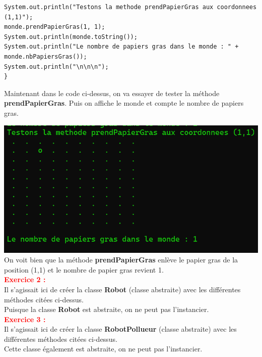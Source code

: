 \documentclass{article}
\begin{document}
\begin{lstlisting}
System.out.println("Testons la methode prendPapierGras aux coordonnees (1,1)");
monde.prendPapierGras(1, 1);
System.out.println(monde.toString());
System.out.println("Le nombre de papiers gras dans le monde : " + monde.nbPapiersGras());
System.out.println("\n\n\n");
}\end{lstlisting}

Maintenant dans le code ci-dessus, on va essayer de tester la méthode \textbf{prendPapierGras}.
Puis on affiche le monde et compte le nombre de papiers gras.

\includegraphics[scale=0.5]{../images/exo1.1.png}\\

On voit bien que la méthode \textbf{prendPapierGras} enlève le papier gras de la position (1,1) et le nombre de papier gras revient 1.\\

\textcolor{red}{\textbf{\Large{Exercice 2 :}}}\\
Il s'agissait ici de créer la classe \textbf{Robot} (classe abstraite) avec les différentes méthodes citées ci-dessus.\\
Puisque la classe \textbf{Robot} est abstraite, on ne peut pas l'instancier.\\

\textcolor{red}{\textbf{\Large{Exercice 3 :}}}\\
Il s'agissait ici de créer la classe \textbf{RobotPollueur} (classe abstraite) avec les différentes méthodes citées ci-dessus.\\
Cette classe également est abstraite, on ne peut pas l'instancier.\\
\end{document}

